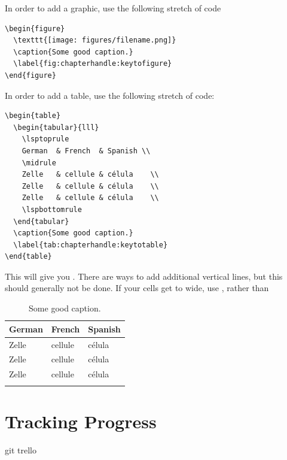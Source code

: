 In order to add a graphic, use the following stretch of code

\begin{verbatim}
\begin{figure}
  \texttt{[image: figures/filename.png]}
  \caption{Some good caption.}
  \label{fig:chapterhandle:keytofigure}
\end{figure}
\end{verbatim}

In order to add a table, use the following stretch of code:

\begin{verbatim}
\begin{table} 
  \begin{tabular}{lll}
    \lsptoprule
    German  & French  & Spanish \\
    \midrule
    Zelle   & cellule & célula    \\
    Zelle   & cellule & célula    \\
    Zelle   & cellule & célula    \\
    \lspbottomrule
  \end{tabular}
  \caption{Some good caption.}
  \label{tab:chapterhandle:keytotable}
\end{table}
\end{verbatim}

This will give you  . There are ways to add additional vertical lines, but this should generally not be done. If your cells get to wide, use , rather than 
\begin{table}[h]
  \begin{tabular}{lll}
    \lsptoprule
    German  & French  & Spanish \\
    \midrule
    Zelle   & cellule & célula    \\
    Zelle   & cellule & célula    \\
    Zelle   & cellule & célula    \\
    \lspbottomrule
  \end{tabular}
  \caption{Some good caption.}
  \label{tab:chapterhandle:keytotable}
\end{table}


\section{Tracking Progress}
git
trello

